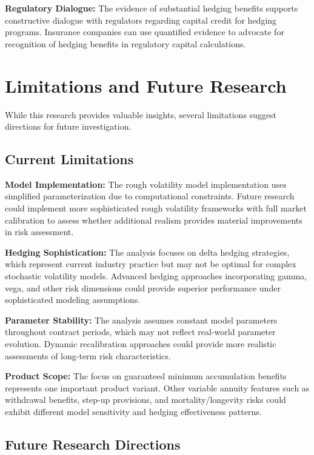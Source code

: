 \documentclass[12pt,a4paper]{report}
\begin{document}
\textbf{Regulatory Dialogue:} The evidence of substantial hedging benefits supports constructive dialogue with regulators regarding capital credit for hedging programs. Insurance companies can use quantified evidence to advocate for recognition of hedging benefits in regulatory capital calculations.

\section{Limitations and Future Research}

While this research provides valuable insights, several limitations suggest directions for future investigation.

\subsection{Current Limitations}

\textbf{Model Implementation:} The rough volatility model implementation uses simplified parameterization due to computational constraints. Future research could implement more sophisticated rough volatility frameworks with full market calibration to assess whether additional realism provides material improvements in risk assessment.

\textbf{Hedging Sophistication:} The analysis focuses on delta hedging strategies, which represent current industry practice but may not be optimal for complex stochastic volatility models. Advanced hedging approaches incorporating gamma, vega, and other risk dimensions could provide superior performance under sophisticated modeling assumptions.

\textbf{Parameter Stability:} The analysis assumes constant model parameters throughout contract periods, which may not reflect real-world parameter evolution. Dynamic recalibration approaches could provide more realistic assessments of long-term risk characteristics.

\textbf{Product Scope:} The focus on guaranteed minimum accumulation benefits represents one important product variant. Other variable annuity features such as withdrawal benefits, step-up provisions, and mortality/longevity risks could exhibit different model sensitivity and hedging effectiveness patterns.

\subsection{Future Research Directions}
\end{document}
